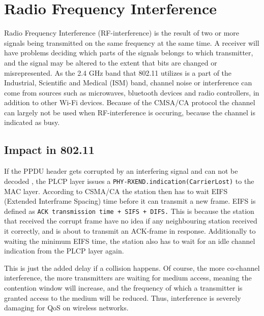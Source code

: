 	\section{Radio Frequency Interference}
	Radio Frequency Interference (RF-interference) is the result
	of two or more signals being transmitted on the same frequency at the same time.
	A receiver will have problems deciding which parts of the signals 
	belongs to which transmitter, and the signal may be altered to the extent
	that bits are changed or misrepresented. As the 2.4 GHz band that 802.11
	utilizes is a part of the Industrial, Scientific and Medical (ISM) band, channel noise or interference
	can come from sources such as microwaves, bluetooth devices and radio controllers, in addition to other Wi-Fi devices. 
	Because of the CMSA/CA protocol the channel can largely not be used when RF-interference is occuring, because the
	channel is indicated as busy. 

	\subsection{Impact in 802.11}
	If the PPDU header
	gets corrupted by an interfering signal and can not be decoded
	, the PLCP layer issues a \verb|PHY-RXEND.indication(CarrierLost)|
	to the MAC layer. According to CSMA/CA the station then has to
	wait EIFS (Extended Interframe Spacing) time before
	it can transmit a new frame. EIFS is defined as
	\verb|ACK transmission time + SIFS + DIFS.| This is because the station that received the corrupt frame have no idea if any neighbouring station
	received it correctly, and is about to transmit an ACK-frame in response. Additionally
	to waiting the minimum EIFS time, the station also has to wait for
	an idle channel indication from the PLCP layer again. 

	This is just the added delay if a collision happens. Of course, the more co-channel interference, the more transmitters are waiting for medium access, meaning
	the contention window will increase, and the frequency of which a transmitter is granted access to the medium will be reduced. Thus, interference is severely damaging for QoS on wireless networks.   %

